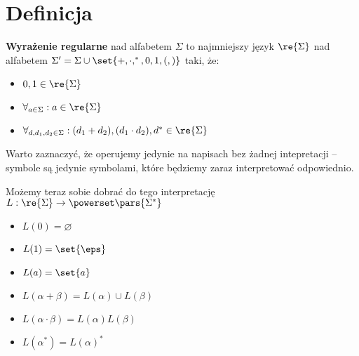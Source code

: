 \section{Definicja}
\begin{definition}
	\textbf{Wyrażenie regularne} nad alfabetem \( \Sigma \) to najmniejszy język \( \re{\Sigma} \) nad alfabetem \( \Sigma' = \Sigma \cup \set{+, \cdot, ^*, 0, 1, (, )} \) taki, że:
	\begin{itemize}
		\item \( 0, 1 \in \re{\Sigma} \)
		\item \( \forall_{a \in \Sigma}: a \in \re{\Sigma} \)
		\item \( \forall_{d, d_1, d_2 \in \Sigma}: (d_1 + d_2), (d_1 \cdot d_2), d^* \in \re{\Sigma} \)
	\end{itemize}
\end{definition}

Warto zaznaczyć, że operujemy jedynie na napisach bez żadnej intepretacji -- symbole są jedynie symbolami, które będziemy zaraz interpretować odpowiednio.

Możemy teraz sobie dobrać do tego interpretację \( L: \re{\Sigma} \rightarrow \powerset\pars{\Sigma^*} \)
\begin{itemize}
	\item \( L(0) = \varnothing \)
	\item \( L(1) = \set{\eps} \)
	\item \( L(a) = \set{a} \)
	\item \( L(\alpha + \beta) = L(\alpha) \cup L(\beta) \)
	\item \( L(\alpha \cdot \beta) = L(\alpha)L(\beta) \)
	\item \( L(\alpha^*) = L(\alpha)^* \)
\end{itemize}
